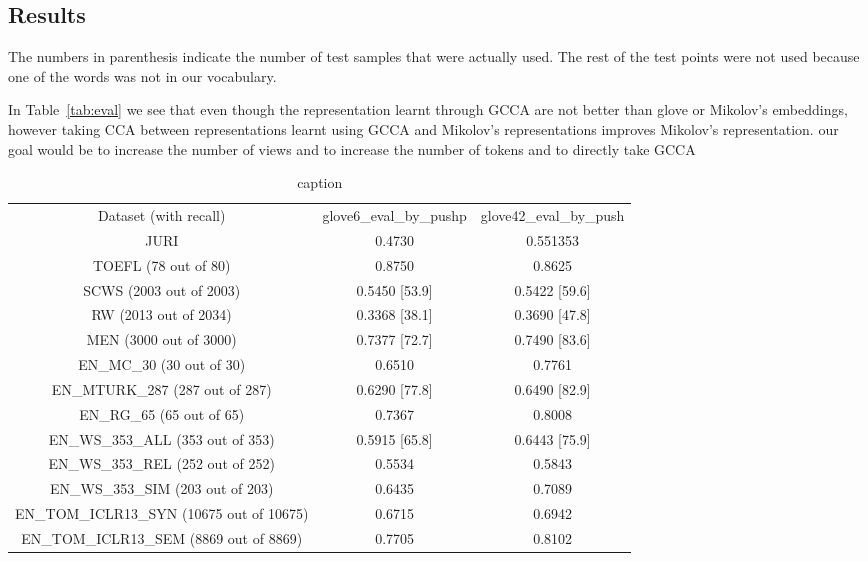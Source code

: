 \documentclass[11pt]{article}
\begin{document}
\subsection{Results}
The numbers in parenthesis indicate the number of test samples that
were actually used. The rest of the test points were not used because
one of the words was not in our vocabulary.  

In Table~\ref{tab:eval} we see that even though the representation
learnt through GCCA are not better than glove or Mikolov's embeddings,
however taking CCA between representations learnt using GCCA and
Mikolov's representations improves Mikolov's representation. our goal
would be to increase the number of views and to increase the number of
tokens and to directly take GCCA 

\begin{table*}[htbp]
  \centering
  \begin{tabular}{ccc}
Dataset (with recall)                     & glove6\_eval\_by\_pushp & glove42\_eval\_by\_push  \\
JURI                                      &        0.4730           &       0.551353           \\
TOEFL (78 out of 80)                      &        0.8750           &      0.8625              \\
SCWS (2003 out of 2003)                   &        0.5450    [53.9] &      0.5422  [59.6]      \\
RW (2013 out of 2034)                     &        0.3368    [38.1] &      0.3690  [47.8]      \\
MEN (3000 out of 3000)                    &        0.7377    [72.7] &      0.7490  [83.6]      \\
EN\_MC\_30 (30 out of 30)                 &        0.6510           &        0.7761            \\
EN\_MTURK\_287 (287 out of 287)           &        0.6290    [77.8] &        0.6490  [82.9]    \\
EN\_RG\_65 (65 out of 65)                 &        0.7367           &        0.8008            \\
EN\_WS\_353\_ALL (353 out of 353)         &        0.5915    [65.8] &         0.6443  [75.9]   \\
EN\_WS\_353\_REL (252 out of 252)         &        0.5534           &         0.5843           \\
EN\_WS\_353\_SIM (203 out of 203)         &        0.6435           &         0.7089           \\
EN\_TOM\_ICLR13\_SYN (10675 out of 10675) &        0.6715           &         0.6942           \\
EN\_TOM\_ICLR13\_SEM (8869 out of 8869)   &        0.7705           &         0.8102           \\
    
  \end{tabular}
  \caption{caption}
  \label{tab:glove}
\end{table*}
\end{document}
